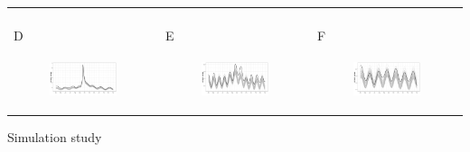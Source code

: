 \documentclass[11pt]{article}
\begin{document}
\begin{suppfigure}[ht]
\begin{tabular}{lll}
\begin{subfigure}[t]{0.30\linewidth}
	\end{subfigure}\\
	D&E&F\\
	\begin{subfigure}[t]{0.30\linewidth}
		\centering
		\includegraphics[width=1\linewidth]{figs/supp-figure-9d.pdf} 
	\end{subfigure}&
	\begin{subfigure}[t]{0.30\linewidth}
		\centering
		\includegraphics[width=1\linewidth]{figs/supp-figure-9e.pdf}
	\end{subfigure}&
	\begin{subfigure}[t]{0.30\linewidth}
		\centering
		\includegraphics[width=1\linewidth]{figs/supp-figure-9f.pdf}
	\end{subfigure}\\	
    \end{tabular}
    \caption{Simulation study}
    \label{fig:simulation}
\end{suppfigure}
\end{document}
